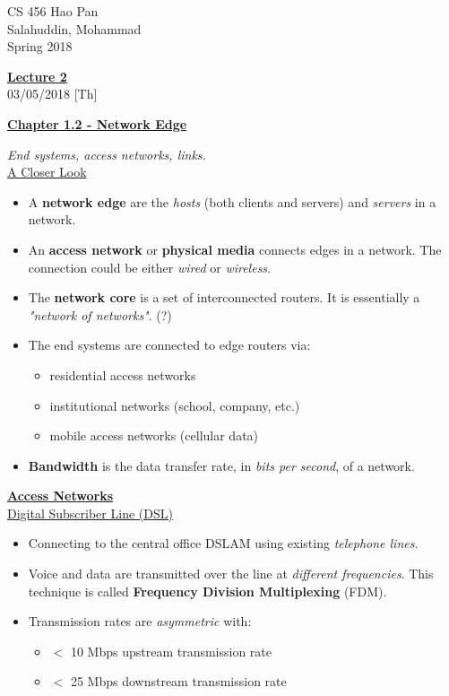 \documentclass{article}
\begin{document}
\noindent
{CS 456 \hfill Hao Pan}\\
{Salahuddin, Mohammad}\\
{Spring 2018}


\begin{center}
\underline{\large \bf Lecture 2}\\
\noindent
{\hfill 03/05/2018 [Th]}
\end{center}

\underline{\bf Chapter 1.2 - Network Edge}\\
\vspace{-4mm}

{\it End systems, access networks, links.}\\

\underline{A Closer Look}

\begin{itemize}
\item A {\bf network edge} are the {\it hosts} (both clients and servers) and {\it servers} in a network.
\item An {\bf access network} or {\bf physical media} connects edges in a network. The connection could be either {\it wired} or {\it wireless}.
\item The {\bf network core} is a set of interconnected routers. It is essentially a {\it "network of networks"}. (?)
\item The end systems are connected to edge routers via:
\begin{itemize}
\item residential access networks
\item institutional networks (school, company, etc.)
\item mobile access networks (cellular data)
\end{itemize}
\item {\bf Bandwidth} is the data transfer rate, in {\it bits per second}, of a network.
\end{itemize}

\bigskip

\underline{\bf Access Networks}\\

\underline{Digital Subscriber Line (DSL)}

\begin{itemize}
\item Connecting to the central office DSLAM using existing {\it telephone lines}.
\item Voice and data are transmitted over the line at {\it different frequencies}. This technique is called {\bf Frequency Division Multiplexing} (FDM).
\item Transmission rates are {\it asymmetric} with:
\begin{itemize}
\item $<$ 10 Mbps upstream transmission rate
\item $<$ 25 Mbps downstream transmission rate
\end{itemize}
\end{itemize}
\end{document}
